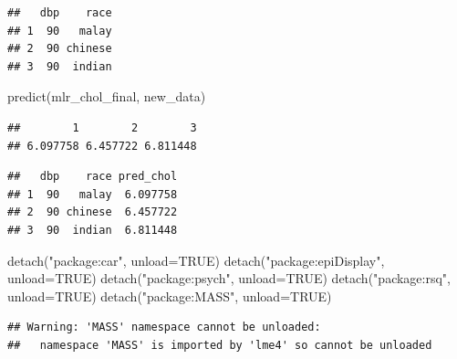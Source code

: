 \documentclass[
]{book}
\makeatletter
\newenvironment{Shaded}{\begin{snugshade}}{\end{snugshade}}
\newcommand{\AttributeTok}[1]{\textcolor[rgb]{0.61,0.61,0.61}{#1}}
\newcommand{\ConstantTok}[1]{\textcolor[rgb]{0,0,0}{#1}}
\newcommand{\FunctionTok}[1]{\textcolor[rgb]{0,0,0}{#1}}
\newcommand{\NormalTok}[1]{#1}
\newcommand{\OtherTok}[1]{\textcolor[rgb]{0.37,0.37,0.37}{#1}}
\newcommand{\SpecialCharTok}[1]{\textcolor[rgb]{0,0,0}{#1}}
\newcommand{\StringTok}[1]{\textcolor[rgb]{0.5,0.5,0.5}{#1}}
\newenvironment{kframe}{%
\medskip{}
\setlength{\fboxsep}{.8em}
 \def\at@end@of@kframe{}%
 \ifinner\ifhmode%
  \def\at@end@of@kframe{\end{minipage}}%
  \begin{minipage}{\columnwidth}%
 \fi\fi%
 \def\FrameCommand##1{\hskip\@totalleftmargin \hskip-\fboxsep
 \colorbox{shadecolor}{##1}\hskip-\fboxsep
     \hskip-\linewidth \hskip-\@totalleftmargin \hskip\columnwidth}%
 \MakeFramed {\advance\hsize-\width
   \@totalleftmargin\z@ \linewidth\hsize
   \@setminipage}}%
 {\par\unskip\endMakeFramed%
 \at@end@of@kframe}
\renewenvironment{Shaded}{\begin{kframe}}{\end{kframe}}
\makeatother
\begin{document}
\begin{verbatim}
##   dbp    race
## 1  90   malay
## 2  90 chinese
## 3  90  indian
\end{verbatim}

\begin{Shaded}
\begin{Highlighting}[]
\FunctionTok{predict}\NormalTok{(mlr\_chol\_final, new\_data)}
\end{Highlighting}
\end{Shaded}

\begin{verbatim}
##        1        2        3 
## 6.097758 6.457722 6.811448
\end{verbatim}

\begin{Shaded}
\end{Shaded}

\begin{verbatim}
##   dbp    race pred_chol
## 1  90   malay  6.097758
## 2  90 chinese  6.457722
## 3  90  indian  6.811448
\end{verbatim}

\begin{Shaded}
\begin{Highlighting}[]
\FunctionTok{detach}\NormalTok{(}\StringTok{"package:car"}\NormalTok{, }\AttributeTok{unload=}\ConstantTok{TRUE}\NormalTok{)}
\FunctionTok{detach}\NormalTok{(}\StringTok{"package:epiDisplay"}\NormalTok{, }\AttributeTok{unload=}\ConstantTok{TRUE}\NormalTok{)}
\FunctionTok{detach}\NormalTok{(}\StringTok{"package:psych"}\NormalTok{, }\AttributeTok{unload=}\ConstantTok{TRUE}\NormalTok{)}
\FunctionTok{detach}\NormalTok{(}\StringTok{"package:rsq"}\NormalTok{, }\AttributeTok{unload=}\ConstantTok{TRUE}\NormalTok{)}
\FunctionTok{detach}\NormalTok{(}\StringTok{"package:MASS"}\NormalTok{, }\AttributeTok{unload=}\ConstantTok{TRUE}\NormalTok{)}
\end{Highlighting}
\end{Shaded}

\begin{verbatim}
## Warning: 'MASS' namespace cannot be unloaded:
##   namespace 'MASS' is imported by 'lme4' so cannot be unloaded
\end{verbatim}
\end{document}
